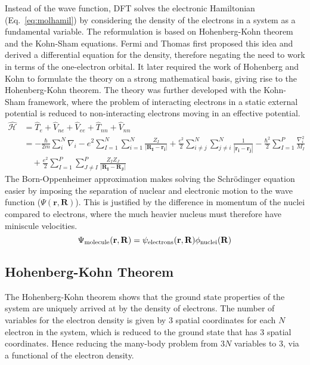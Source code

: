 Instead of the wave function, DFT solves the electronic Hamiltonian (Eq.~\ref{eq:molhamil}) by considering the density of the electrons in a system as a fundamental variable. The reformulation is based on Hohenberg-Kohn theorem and the Kohn-Sham equations. Fermi and Thomas first proposed this idea and derived a differential equation for the density, therefore negating the need to work in terms of the one-electron orbital. It later required the work of Hohenberg and Kohn to formulate the theory on a strong mathematical basis, giving rise to the Hohenberg-Kohn theorem. The theory was further developed with the Kohn-Sham framework, where the problem of interacting electrons in a static external potential is reduced to non-interacting electrons moving in an effective potential. 
%
\begin{equation} \label{eq:molhamil}
\begin{split}
\hat{\mathcal{H}}  &=  \hat{T}_e + \hat{V}_{ne} + \hat{V}_{ee} + \hat{T}_{nn} + \hat{V}_{nn}
\\ &= - \frac{\hbar}{2m} \sum_{i}^{N} \nabla_i - e^2 \sum_{I=1}^{N} \sum_{i=1}^{N} \frac{Z_I}{|\mathbf{R_I - r_i}|}  + \frac{e^2}{2} \sum_{i \neq j}^{N} \sum_{j \neq i}^{N} \frac{1}{|\mathbf{r_i - r_j}|} - \frac{\hbar^2}{2} \sum_{I=1}^{P} \frac{\nabla_i^2}{M_I} \\
& \quad + \frac{e^2}{2} \sum_{I=1}^{P} \sum_{J \neq I}^{P} \frac{Z_I Z_J}{|\mathbf{R_I - R_J}|}
\end{split}
\end{equation} 
%
The Born-Oppenheimer approximation makes solving the Schr\"odinger equation easier by imposing the separation of nuclear and electronic motion to the wave function ($\Psi(\mathbf{r}, \mathbf{R})$).\cite{BO} This is justified by the difference in momentum of the nuclei compared to electrons, where the much heavier nucleus must therefore have miniscule velocities. 
%
\begin{equation} \label{eq:BO}
\Psi_{\rm{molecule}}(\mathbf{r}, \mathbf{R}) = \psi_{\rm{electrons}}(\mathbf{r}, \mathbf{R}) \phi_{\rm{nuclei}}(\mathbf{R})
\end{equation}
%
\subsection{Hohenberg-Kohn Theorem}
%
The Hohenberg-Kohn theorem shows that the ground state properties of the system are uniquely arrived at by the density of electrons.\cite{hohkohn} The number of variables for the electron density is given by 3 spatial coordinates for each $N$ electron in the system, which is reduced to the ground state that has 3 spatial coordinates. Hence reducing the many-body problem from $3N$ variables to 3, via a functional of the electron density.

